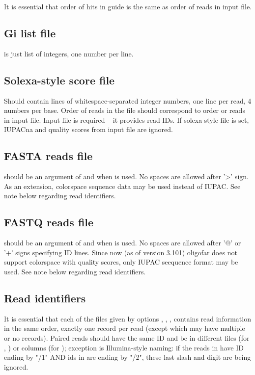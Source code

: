 \documentclass[english]{article}
\begin{document}
    It is essential that order of hits in guide is the same as order of reads in
    input file.

\subsection{Gi list file}
    is just list of integers, one number per line.
    
\subsection{Solexa-style score file}
    Should contain lines of whitespace-separated integer numbers, one line per
    read, 4 numbers per base. Order of reads in the file should correspond to
    order or reads in input file. Input file is required -- it provides read
    IDs. If solexa-style file is set, IUPACna and quality scores from input
    file are ignored.

\subsection{FASTA reads file}
    should be an argument of  and  when  is used. No spaces are allowed
    after '>' sign. As an extension, colorspace sequence data may be used
    instead of IUPAC.  See note below regarding read identifiers.

\subsection{FASTQ reads file}
    should be an argument of  and  when  is used.  No spaces are
    allowed after '@' or '+' signs specifying ID lines.  Since now (as of
    version 3.101) oligofar does not support colorspace with quality scores,
    only IUPAC seequence format may be used. See note below regarding read
    identifiers.

\subsection{Read identifiers}
    It is essential that each of the files given by options , , , 
    contains read information in the same order, exactly one record per read
    (except  which may have multiple or no records).  Paired reads should
    have the same ID and be in different files (for , ) or columns 
    (for ); exception is Illumina-style naming: if the reads in  have ID
    ending by "/1" AND ids in  are ending by "/2", these last slash and 
    digit are being ignored. 
    
\end{document}

